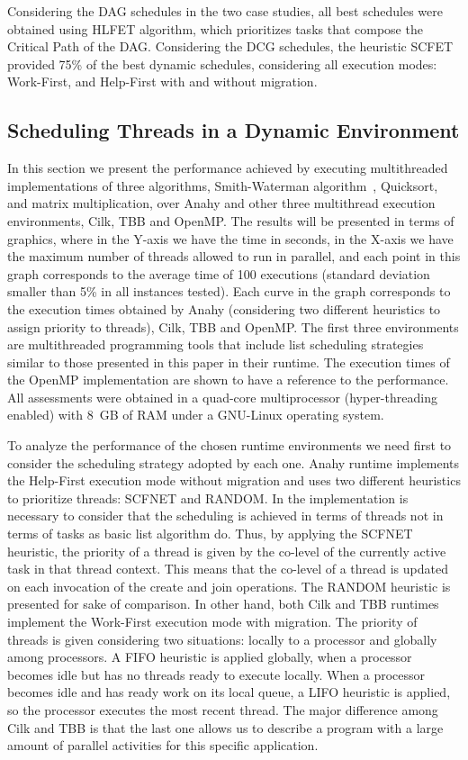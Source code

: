 \documentclass[twocolumn]{svjour3}
\begin{document}
Considering the DAG schedules in the two case studies, all best schedules were obtained using HLFET algorithm, which prioritizes tasks that compose the Critical Path of the DAG. Considering the DCG schedules, the heuristic SCFET provided 75\% of the best dynamic schedules, considering all execution modes: Work-First, and Help-First with and without migration.

\subsection{Scheduling Threads in a Dynamic Environment}

In this section we present the performance achieved by executing multithreaded implementations of three algorithms, Smith-Waterman algorithm~\cite{smith-waterman}, Quicksort, and matrix multiplication, over Anahy and other three multithread execution environments, Cilk, TBB and OpenMP. The results will be presented in terms of graphics, where in the Y-axis we have the time in seconds, in the X-axis we have the maximum number of threads allowed to run in parallel, and each point in this graph corresponds to the average time of 100 executions (standard deviation smaller than 5\% in all instances tested). Each curve in the graph corresponds to the execution times obtained by Anahy (considering two different heuristics to assign priority to threads), Cilk, TBB and OpenMP. The first three environments are multithreaded programming tools that include list scheduling strategies similar to those presented in this paper in their runtime. The execution times of the OpenMP implementation are shown to have a reference to the performance. All assessments were obtained in a quad-core multiprocessor (hyper-threading enabled) with 8~GB of RAM under a GNU-Linux operating system.

To analyze the performance of the chosen runtime environments we need first to consider the scheduling strategy adopted by each one. Anahy runtime implements the Help-First execution mode without migration and uses two different heuristics to prioritize threads: SCFNET and RANDOM. In the implementation is necessary to consider that the scheduling is achieved in terms of threads not in terms of tasks as basic list algorithm do. Thus, by applying the SCFNET heuristic, the priority of a thread is given by the co-level of the currently active task in that thread context. This means that the co-level of a thread is updated on each invocation of the create and join operations. The RANDOM heuristic is presented for sake of comparison. In other hand, both Cilk and TBB runtimes implement the Work-First execution mode with migration. The priority of threads is given considering two situations: locally to a processor and globally among processors. A FIFO heuristic is applied globally, when a processor becomes idle but has no threads ready to execute locally. When a processor becomes idle and has ready work on its local queue, a LIFO heuristic is applied, so the processor executes the most recent thread. The major difference among Cilk and TBB is that the last one allows us to describe a program with a large amount of parallel activities for this specific application.
\end{document}
